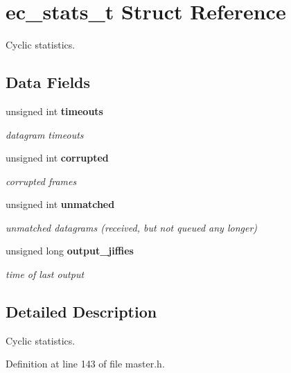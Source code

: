\section{ec\-\_\-stats\-\_\-t Struct Reference}
\label{structec__stats__t}


Cyclic statistics.  


\subsection*{Data Fields}
\begin{DoxyCompactItemize}
\item 
unsigned int {\bf timeouts}\label{structec__stats__t_a955d4a4b543d39ef33e3be00b7035551}

\begin{DoxyCompactList}\small\item\em datagram timeouts \end{DoxyCompactList}\item 
unsigned int {\bf corrupted}\label{structec__stats__t_a05d3aa920802468a437e8518d84b5b4c}

\begin{DoxyCompactList}\small\item\em corrupted frames \end{DoxyCompactList}\item 
unsigned int {\bf unmatched}\label{structec__stats__t_ace86973203e2ef1838f9345f9eb2d767}

\begin{DoxyCompactList}\small\item\em unmatched datagrams (received, but not queued any longer) \end{DoxyCompactList}\item 
unsigned long {\bf output\-\_\-jiffies}\label{structec__stats__t_a1b5236e09088fa71c8bdc73b4f9de70a}

\begin{DoxyCompactList}\small\item\em time of last output \end{DoxyCompactList}\end{DoxyCompactItemize}


\subsection{Detailed Description}
Cyclic statistics. 

Definition at line 143 of file master.\-h.

